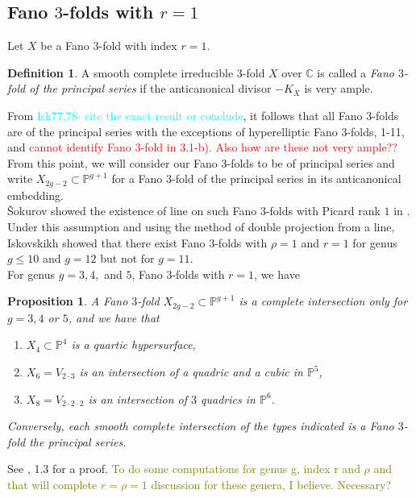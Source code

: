 \documentclass[11pt]{amsart}
\theoremstyle{plain}
\newtheorem{proposition}[theorem]{Proposition}
\theoremstyle{definition}
\newtheorem{definition}[theorem]{Definition}
\theoremstyle{expl}
\begin{document}
\subsection{Fano $3$-folds with $r=1$}	
Let $X$ be a Fano $3$-fold with index $r=1$.
\begin{definition}
    A smooth complete irreducible $3$-fold $X$ over $\mathbb{C}$ is called a \textit{Fano $3$-fold of the principal series} if the anticanonical divisor $-K_X$ is very ample.
\end{definition}
From \textcolor{cyan}{Isk77,78- cite the exact result or conclude}, it follows that all Fano $3$-folds are of the principal series with the exceptions of hyperelliptic Fano $3$-folds, 1-11, and \textcolor{red}{cannot identify Fano $3$-fold in 3.1-b). Also how are these not very ample??} From this point, we will consider our Fano $3$-folds to be of principal series and write $X_{2g-2} \subset \mathbb{P}^{g+1}$ for a Fano $3$-fold of the principal series in its anticanonical embedding.\\
\v{S}okurov showed the existence of line on such Fano $3$-folds with Picard rank $1$ in \cite{Sokuline}. Under this assumption and using the method of double projection from a line, Iskovskikh showed that there exist Fano $3$-folds with $\rho =1$ and $r=1$ for genus $g \leq 10$ and $g=12$ but not for $g=11$.\\
For genus $g=3, 4,$ and $5$, Fano $3$-folds with $r=1$, we have
\begin{proposition}
    A Fano $3$-fold $X_{2g-2}\subset \mathbb{P}^{g+1}$ is a complete intersection only for $g=3, 4$ or $5$, and we have that 
    \begin{enumerate}
    \item[1-2 a):] $X_4 \subset \mathbb{P}^4$ is a quartic hypersurface,
    \item[1-3 :] $X_6 = V_{2\cdot 3}$ is an intersection of a quadric and a cubic in $\mathbb{P}^5$,
    \item[1-4 :] $X_8 = V_{2\cdot 2\cdot 2}$ is an intersection of $3$ quadrics in $\mathbb{P}^6$.
    \end{enumerate}
    Conversely, each smooth complete intersection of the types indicated is a Fano $3$-fold the principal series. 
\end{proposition}
See \cite{Isk78}, 1.3 for a proof.
\textcolor{olive}{To do some computations for genus g, index r and $\rho$ and that will complete $r=\rho=1$ discussion for these genera, I believe. Necessary?}
 
\end{document}
